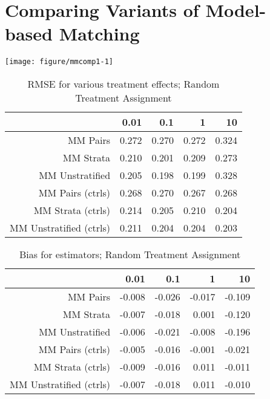 \documentclass[11pt]{article}\usepackage[]{graphicx}\usepackage[]{color}
\makeatletter
\def\maxwidth{ %
  \ifdim\Gin@nat@width>\linewidth
    \linewidth
  \else
    \Gin@nat@width
  \fi
}
\newenvironment{knitrout}{}{} %
\makeatother
\begin{document}
\section{Comparing Variants of Model-based Matching}


\begin{knitrout}
\color{fgcolor}

{\centering \texttt{[image: figure/mmcomp1-1]} 

}



\end{knitrout}

\begin{table}[ht]
\centering
\begin{tabular}{rrrrr}
  \hline
 & 0.01 & 0.1 & 1 & 10 \\ 
  \hline
MM Pairs & 0.272 & 0.270 & 0.272 & 0.324 \\ 
  MM Strata & 0.210 & 0.201 & 0.209 & 0.273 \\ 
  MM Unstratified & 0.205 & 0.198 & 0.199 & 0.328 \\ 
  MM Pairs (ctrls) & 0.268 & 0.270 & 0.267 & 0.268 \\ 
  MM Strata (ctrls) & 0.214 & 0.205 & 0.210 & 0.204 \\ 
  MM Unstratified (ctrls) & 0.211 & 0.204 & 0.204 & 0.203 \\ 
   \hline
\end{tabular}
\caption{RMSE for various treatment effects; Random Treatment Assignment} 
\label{tab:mmcomp1}
\end{table}
\begin{table}[ht]
\centering
\begin{tabular}{rrrrr}
  \hline
 & 0.01 & 0.1 & 1 & 10 \\ 
  \hline
MM Pairs & -0.008 & -0.026 & -0.017 & -0.109 \\ 
  MM Strata & -0.007 & -0.018 & 0.001 & -0.120 \\ 
  MM Unstratified & -0.006 & -0.021 & -0.008 & -0.196 \\ 
  MM Pairs (ctrls) & -0.005 & -0.016 & -0.001 & -0.021 \\ 
  MM Strata (ctrls) & -0.009 & -0.016 & 0.011 & -0.011 \\ 
  MM Unstratified (ctrls) & -0.007 & -0.018 & 0.011 & -0.010 \\ 
   \hline
\end{tabular}
\caption{Bias for estimators; Random Treatment Assignment} 
\label{tab:mmcomp1}
\end{table}
\end{document}
